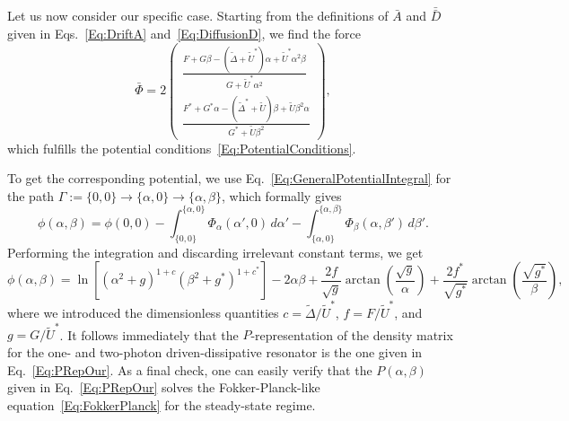 Let us now consider our specific case.
Starting from the definitions of $\bar{A}$ and $\bar{\bar{D}}$ given in Eqs.~\eqref{Eq:DriftA} and~\eqref{Eq:DiffusionD}, we find the force
\begin{equation}\label{Eq:GeneralizedForceOur}
\bar{\Phi}=2
\begin{pmatrix}
\frac{F+G\beta-\left(\widetilde{\Delta}+\widetilde{U}^*\right)\alpha
	+\widetilde{U}^*\alpha^2\beta}
{G+\widetilde{U}^*\alpha^2} \\[8pt]
\frac{F^*+G^*\alpha-\left(\widetilde{\Delta}^*+\widetilde{U}\right)\beta
	+\widetilde{U}\beta^2\alpha}
{G^*+\widetilde{U}\beta^2}
\end{pmatrix},
\end{equation}
which fulfills the potential conditions~\eqref{Eq:PotentialConditions}.
\begin{widetext}
	To get the corresponding potential, we use Eq.~\eqref{Eq:GeneralPotentialIntegral} for the path $\Gamma:=\{0,0\}\to\{\alpha,0\}\to\{\alpha,\beta\}$, which formally gives
	\begin{equation}
	\phi(\alpha,\beta)=\phi(0,0)
	-\int_{\{0,0\}}^{\{\alpha,0\}} \Phi_\alpha(\alpha',0)\, d\alpha'
	-\int_{\{\alpha,0\}}^{\{\alpha,\beta\}} \Phi_\beta(\alpha,\beta')\, d\beta'.
	\end{equation}
	Performing the integration and discarding irrelevant constant terms, we get
	\begin{equation}\label{Eq:PotentialOur}
	\phi(\alpha,\beta)=
	\ln\left[\left(\alpha^2+g\right)^{1+c}\left(\beta^2+g^*\right)^{1+c^*}\right]
	-2\alpha\beta
	+\frac{2f}{\sqrt{g}}\arctan\left(\frac{\sqrt{g}}{\alpha}\right)
	+\frac{2f^*}{\sqrt{g^*}}\arctan\left(\frac{\sqrt{g^*}}{\beta}\right),
	\end{equation}
where we introduced the dimensionless quantities $c=\widetilde{\Delta}/\widetilde{U}^*$, $f=F/\widetilde{U}^*$, and $g=G/\widetilde{U}^*$.
It follows immediately that the $P$-representation of the density matrix for the one- and two-photon driven-dissipative resonator is the one given in Eq.~\eqref{Eq:PRepOur}.
As a final check, one can easily verify that the $P(\alpha,\beta)$ given in Eq.~\eqref{Eq:PRepOur} solves the Fokker-Planck-like equation~\eqref{Eq:FokkerPlanck} for the steady-state regime. 

\end{widetext}


